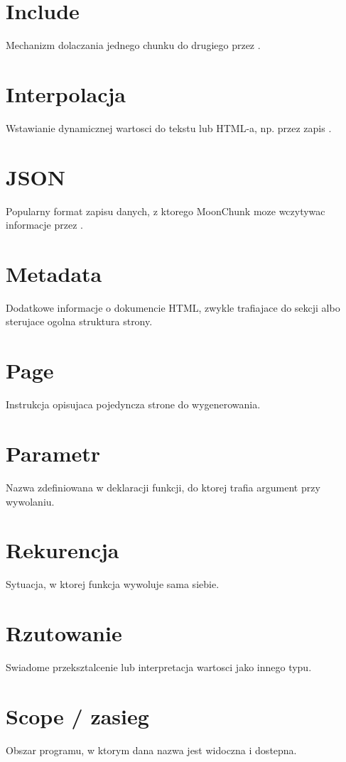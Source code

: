 \section*{Include}
Mechanizm dolaczania jednego chunku do drugiego przez .

\section*{Interpolacja}
Wstawianie dynamicznej wartosci do tekstu lub HTML-a, np. przez zapis .

\section*{JSON}
Popularny format zapisu danych, z ktorego MoonChunk moze wczytywac informacje przez
.

\section*{Metadata}
Dodatkowe informacje o dokumencie HTML, zwykle trafiajace do sekcji  albo
sterujace ogolna struktura strony.

\section*{Page}
Instrukcja opisujaca pojedyncza strone do wygenerowania.

\section*{Parametr}
Nazwa zdefiniowana w deklaracji funkcji, do ktorej trafia argument przy wywolaniu.

\section*{Rekurencja}
Sytuacja, w ktorej funkcja wywoluje sama siebie.

\section*{Rzutowanie}
Swiadome przeksztalcenie lub interpretacja wartosci jako innego typu.

\section*{Scope / zasieg}
Obszar programu, w ktorym dana nazwa jest widoczna i dostepna.

